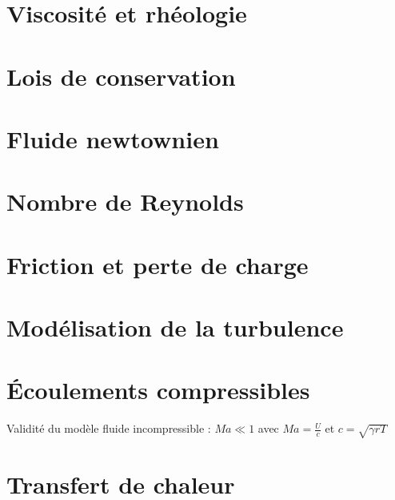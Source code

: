 \documentclass[10pt,a4paper,twocolumn,fleqn]{article}
\begin{document}
\section{Viscosité et rhéologie}\label{sec:rheo}


\section{Lois de conservation}


\section{Fluide newtownien}


\section{Nombre de Reynolds} %


\section{Friction et perte de charge} %


\section{Modélisation de la turbulence}


\section{Écoulements compressibles}

Validité du modèle fluide incompressible : $Ma \ll 1$
avec $Ma=\frac{U}{c}$ et $c=\sqrt{\gamma r T}$


\section{Transfert de chaleur}

\end{document}
